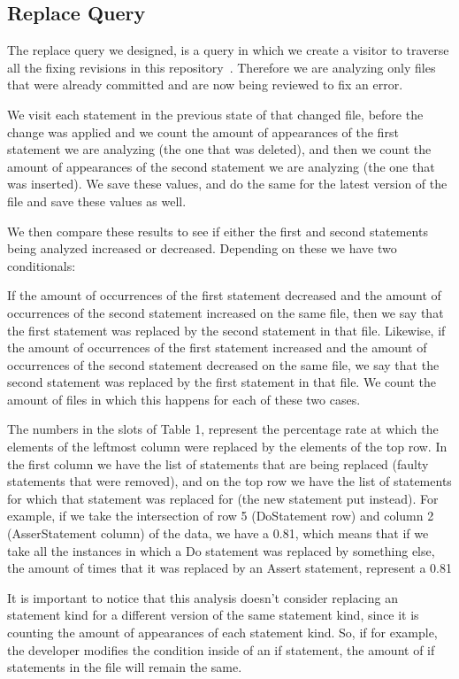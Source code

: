 \documentclass{sig-alternate-05-2015}
\begin{document}
\subsection{Replace Query}
The replace query we designed, is a query in which we create a visitor to traverse all the fixing revisions in this repository~\cite{dyer2013}. Therefore we are analyzing only files
that were already committed and are now being reviewed to fix an error. 

We visit each statement in the previous state of that changed
file, before the change was applied and we count the amount of appearances of
the first statement we are analyzing (the one that was deleted), and then we
count the amount of appearances of the second statement we are analyzing (the
one that was inserted). We save these values, and do the same for the latest
version of the file and save these values as well.

We then compare these results to see if either the first and second statements
being analyzed increased or decreased. Depending on these we have two
conditionals:

If the amount of occurrences of the first statement decreased and the amount of
occurrences of the second statement increased on the same file, then we say that
the first statement was replaced by the second statement in that file. Likewise,
if the amount of occurrences of the first statement increased and the amount of
occurrences of the second statement decreased on the same file, we say that the
second statement was replaced by the first statement in that file. We count the
amount of files in which this happens for each of these two cases.

The numbers in the slots of Table 1, represent the percentage rate at which the elements of the leftmost column were replaced by the elements of the top row. In the first column we have the list of statements that are being replaced (faulty statements that were removed), and on the top row we have the list of statements for which that statement was replaced for (the new statement put instead). For example, if we take the intersection of row 5 (DoStatement row) and column 2 (AsserStatement column) of the data, we have a 0.81, which means that if we take all the instances in which a Do statement was replaced by something else, the amount of times that it was replaced by an Assert statement, represent a 0.81%

It is important to notice  that this analysis doesn't consider replacing an statement kind for a different version of the same statement kind, since it is counting the amount of appearances of each statement kind. So, if for example, the developer modifies the condition inside of an if statement, the amount of if statements in the file will remain the same.
\end{document}
